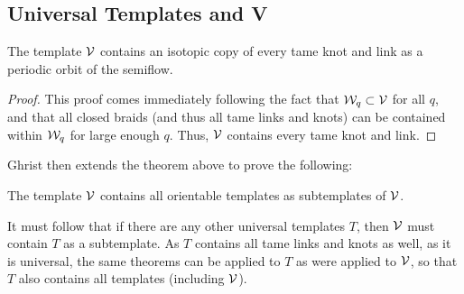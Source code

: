 \documentclass[paper.tex]{subfiles}
\begin{document}
\subsection{Universal Templates and V}

\begin{thm}[Ghrist 1996]
    The template $\mathcal{V}$ contains an isotopic copy of every tame knot and link as a periodic orbit of the semiflow.
\end{thm}
\begin{proof}
    This proof comes immediately following the fact that $\mathcal{W}_q \subset \mathcal{V}$ for all $q$, and that all closed braids (and thus all tame links and knots) can be contained within $\mathcal{W}_q$ for large enough $q$. Thus, $\mathcal{V}$ contains every tame knot and link.
\end{proof}


Ghrist then extends the theorem above to prove the following:

\begin{thm}[Ghrist 1996]
    The template $\mathcal{V}$ contains all orientable templates as subtemplates of $\mathcal{V}$.
\end{thm}

It must follow that if there are any other universal templates $T$, then $\mathcal{V}$ must contain $T$ as a subtemplate. As $T$ contains all tame links and knots as well, as it is universal, the same theorems can be applied to $T$ as were applied to $\mathcal{V}$, so that $T$ also contains all templates (including $\mathcal{V}$).
\end{document}
